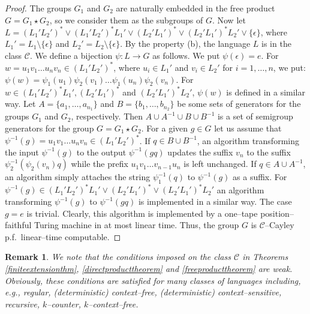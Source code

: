 \documentclass[article,12pt]{elsarticle}
\newtheorem{remark}{Remark}
\newcommand\ClinearC{$\mathcal{C}$--Cayley p.f.~linear--time computable}
\begin{document}
\begin{proof}
	The groups $G_1$ and $G_2$ are naturally embedded  
	in the free product $G = G_1 \star G_2$, so we consider them 
	as the subgroups of $G$. 
	Now let $L= (L_1' L_2')^* \vee
	(L_1' L_2')^* L_1' \vee 
	(L_2' L_1')^* \vee         
	(L_2' L_1')^* L_2' 
	\vee \{\epsilon\}$, where  
	$L_1 ' = L_1 \setminus \{ \epsilon \}$ and 
	$L_2 ' = L_2 \setminus \{ \epsilon \}$. 
	By the property (b), the language $L$ is 
	in the class $\mathcal{C}$. 
	We define a bijection  
	$\psi: L \rightarrow G$ as follows. 
	We put $\psi (\epsilon) = e$. For 
	$w = u_1 v_1 \dots u_n v_n \in (L_1 ' L_2 ')^*$, 
	where $u_i \in L_1 '$ and $v_i \in L_2 '$ for  
	$i=1, \dots, n$, we put:  
	$\psi(w) = \psi_1 (u_1) \psi_2 (v_1) \dots 
	\psi_1 (u_n) \psi_2 (v_n)$.      
	For $w \in (L_1' L_2')^* L_1',  (L_2' L_1')^*$ and  
	$(L_2' L_1')^* L_2'$, $\psi (w)$ is defined in 
	a similar way. 
	Let $A = \{ a_1, \dots, a_{n_1}\}$ and 
	$B = \{b_1, \dots, b_{n_2} \}$ be some sets of 
	generators for the groups $G_1$ and $G_2$, 
	respectively. 
	Then $A \cup A^{-1} \cup B \cup B^{-1}$ is a 
	set of semigroup generators for the group 
	$G = G_1 \star G_2$.  
	For a given $g \in G$ let us assume that  
	$\psi^{-1} (g) = u_1 v_1 \dots u_n v_n  
	\in (L_1 ' L_2 ')^*$.     
	If $q \in B \cup B^{-1}$, an algorithm 
	transforming the input $\psi^{-1}(g)$ 
	to the output $\psi^{-1}(gq)$ updates the 
	suffix $v_n$ to the suffix 
	$\psi_2 ^{-1}(\psi_2 (v_n) q)$ while the 
	prefix $u_1 v_1 \dots v_{n-1}u_n$ is left unchanged.    
	If $q \in A \cup A^{-1}$, an algorithm 
	simply attaches the string $\psi_1 ^{-1} (q)$ to 
	$\psi^{-1}(g)$ as a suffix.  
	For $\psi^{-1}(g) \in (L_1' L_2')^* L_1' \vee 
	(L_2' L_1')^* \vee         
	(L_2' L_1')^* L_2'$ an algorithm transforming 
	$\psi^{-1}(g)$ to $\psi^{-1}(gq)$ is 
	implemented in a similar way.
	The case $g=e$ is trivial.  
	Clearly, this algorithm is implemented  
	by a one--tape position--faithful Turing 
	machine in at most linear time. 
	Thus, the group $G$ is 
	\ClinearC. 
\end{proof}

\begin{remark} 
	\label{remarkconditions1}	
	We note that the conditions imposed on the 
	class $\mathcal{C}$ 
	in Theorems \ref{finiteextensionthm}, \ref{directproducttheorem} 
	and \ref{freeproducttheorem}
	are  weak. Obviously,
	these conditions 
	are satisfied for many 
	classes of languages including,
	e.g., regular,  
	(deterministic) context--free, %
	(deterministic) context--sensitive, 
	recursive, %
	$k$--counter, $k$--context--free.     
\end{remark}	
\end{document}
